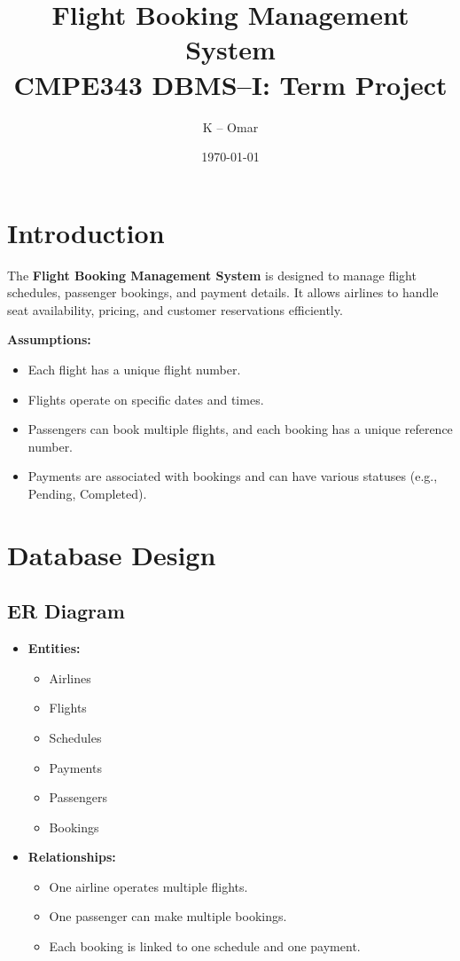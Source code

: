 \documentclass[14pt,a4paper]{extarticle}
\title{\textbf{Flight Booking Management System}\\
       \large CMPE343 DBMS--I: Term Project}
\author{
    K -- Omar
}
\date{\today}
\begin{document}
\maketitle
\tableofcontents

\newpage

\section{Introduction}

The \textbf{Flight Booking Management System} is designed to manage flight schedules, passenger bookings, and payment details. It allows airlines to handle seat availability, pricing, and customer reservations efficiently.

\textbf{Assumptions:}
\begin{itemize}
    \item Each flight has a unique flight number.
    \item Flights operate on specific dates and times.
    \item Passengers can book multiple flights, and each booking has a unique reference number.
    \item Payments are associated with bookings and can have various statuses (e.g., Pending, Completed).
\end{itemize}

\newpage

\section{Database Design}

\subsection{ER Diagram}

\begin{itemize}
    \item \textbf{Entities:}
    \begin{itemize}
    \item Airlines
    \item Flights
    \item Schedules
    \item Payments
    \item Passengers
    \item Bookings
    \end{itemize}
    \item \textbf{Relationships:}
        \begin{itemize}
            \item One airline operates multiple flights.
            \item One passenger can make multiple bookings.
            \item Each booking is linked to one schedule and one payment.
        \end{itemize}
\end{itemize}
\end{document}
